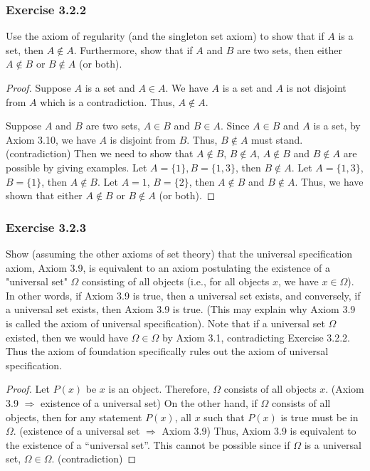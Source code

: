 \documentclass[12pt, letter]{article}
\begin{document}
\subsubsection*{Exercise 3.2.2}
Use the axiom of regularity (and the singleton set axiom) to show that if $A$ is a set, then $A\notin A$. Furthermore, show that 
if $A$ and $B$ are two sets, then either $A\notin B$ or $B\notin A$ (or both).
\begin{proof}
    Suppose $A$ is a set and $A\in A$. We have $A$ is a set and $A$ is not disjoint from $A$ which is a contradiction. Thus, $A\notin A$.

    Suppose $A$ and $B$ are two sets, $A\in B$ and $B\in A$. Since $A\in B$ and $A$ is a set, by Axiom 3.10, we have $A$ is disjoint from $B$.
    Thus, $B\notin A$ must stand. (contradiction) Then we need to show that $A\notin B$, $B\notin A$, $A\notin B$ and $B\notin A$ are possible by giving examples.
    Let $A=\{1\}, B=\{1,3\}$, then $B\notin A$. Let $A=\{1,3\}$, $B=\{1\}$, then $A\notin B$. Let $A={1}$, $B=\{2\}$, then $A\notin B$ and $B\notin A$. Thus, we have shown that 
    either $A\notin B$ or $B\notin A$ (or both).  
\end{proof}
\subsubsection*{Exercise 3.2.3}
Show (assuming the other axioms of set theory) that the universal specification axiom, Axiom 3.9, is equivalent to an axiom postulating the existence of a "universal set" $\Omega$ consisting of 
all objects (i.e., for all objects $x$, we have $x\in\Omega$). In other words, if Axiom 3.9 is true, then a universal set exists, and conversely, if a universal set exists, then Axiom 3.9 is true. 
(This may explain why Axiom 3.9 is called the axiom of universal specification). Note that if a universal set $\Omega$ existed, then we would have $\Omega\in\Omega$ by Axiom 3.1, contradicting Exercise 3.2.2. Thus 
the axiom of foundation specifically rules out the axiom of universal specification.
\begin{proof}
    Let $P(x)$ be $x$ is an object. Therefore, $\Omega$ consists of all objects $x$. (Axiom 3.9 $\Rightarrow$ existence of a universal set) On the other hand, 
    if $\Omega$ consists of all objects, then for any statement $P(x)$, all $x$ such that $P(x)$ is true must be in $\Omega$. (existence of a universal set $\Rightarrow$ Axiom 3.9) Thus, 
    Axiom 3.9 is equivalent to the existence of a ``universal set''. This cannot be possible since if $\Omega$ is a universal set, 
    $\Omega\in\Omega$. (contradiction)
\end{proof}
\end{document}
